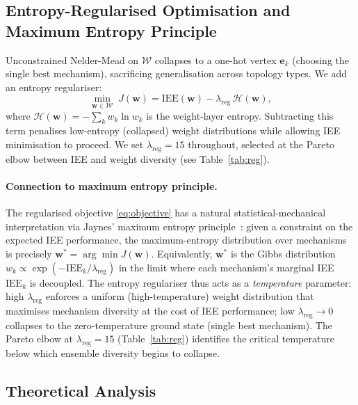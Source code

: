 \documentclass[review,12pt]{elsarticle}
\newcommand{\bfw}{\mathbf{w}}
\newcommand{\IEE}{\mathrm{IEE}}
\begin{document}
\subsection{Entropy-Regularised Optimisation and Maximum Entropy Principle}
\label{sec:max_entropy}

Unconstrained Nelder-Mead on $\mathcal{W}$ collapses to a one-hot vertex
$\mathbf{e}_k$ (choosing the single best mechanism), sacrificing
generalisation across topology types. We add an entropy regulariser:
\begin{equation}
  \min_{\bfw \in \mathcal{W}}\; J(\bfw)
    = \IEE(\bfw) - \lambda_{\mathrm{reg}}\,\mathcal{H}(\bfw),
  \label{eq:objective}
\end{equation}
where $\mathcal{H}(\bfw) = -\sum_k w_k \ln w_k$ is the weight-layer
entropy. Subtracting this term penalises low-entropy (collapsed) weight
distributions while allowing IEE minimisation to proceed. We set
$\lambda_{\mathrm{reg}} = 15$ throughout, selected at the Pareto elbow
between IEE and weight diversity (see Table~\ref{tab:reg}).

\paragraph{Connection to maximum entropy principle.}
The regularised objective \eqref{eq:objective} has a natural
statistical-mechanical interpretation via Jaynes' maximum entropy
principle~\cite{jaynes1957information}: given a constraint on the expected
IEE performance, the maximum-entropy distribution over mechanisms is
precisely $\bfw^* = \arg\min J(\bfw)$.  Equivalently, $\bfw^*$ is the
Gibbs distribution $w_k \propto \exp(-\IEE_k / \lambda_{\mathrm{reg}})$
in the limit where each mechanism's marginal IEE $\IEE_k$ is decoupled.
The entropy regulariser thus acts as a \emph{temperature} parameter:
high $\lambda_{\mathrm{reg}}$ enforces a uniform (high-temperature) weight
distribution that maximises mechanism diversity at the cost of IEE
performance; low $\lambda_{\mathrm{reg}} \to 0$ collapses to the zero-temperature
ground state (single best mechanism).  The Pareto elbow at $\lambda_{\mathrm{reg}} = 15$
(Table~\ref{tab:reg}) identifies the critical temperature below which
ensemble diversity begins to collapse.

\subsection{Theoretical Analysis}
\label{sec:theory}
\end{document}
